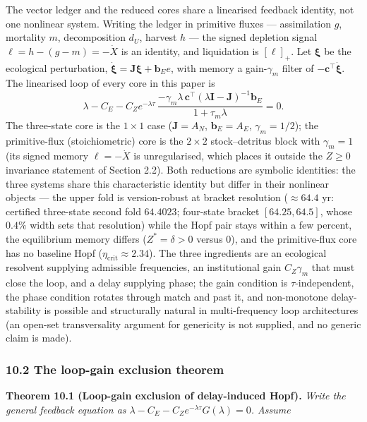 \documentclass[11pt]{article}
\begin{document}
The vector ledger and the reduced cores share a linearised feedback
identity, not one nonlinear system. Writing the ledger in primitive
fluxes --- assimilation \(g\), mortality \(m\), decomposition \(d_U\),
harvest \(h\) --- the signed depletion signal
\(\ell = h - (g - m) = -\dot X\) is an identity, and liquidation is
\([\ell]_+\). Let \(\boldsymbol{\xi}\) be the ecological perturbation,
\(\dot{\boldsymbol{\xi}} = \mathbf{J}\boldsymbol{\xi} + \mathbf{b}_E e\),
with memory a gain-\(\gamma_m\) filter of
\(-\mathbf{c}^\top\dot{\boldsymbol{\xi}}\). The linearised loop of every
core in this paper is
\[\lambda - C_E - C_Z e^{-\lambda\tau}\, \frac{-\gamma_m\lambda\,\mathbf{c}^\top(\lambda\mathbf{I} - \mathbf{J})^{-1}\mathbf{b}_E}{1 + \tau_m\lambda} = 0. \tag{14}\]
The three-state core is the \(1\times1\) case (\(\mathbf{J} = A_N\),
\(\mathbf{b}_E = A_E\), \(\gamma_m = 1/2\)); the primitive-flux
(stoichiometric) core is the \(2\times2\) stock--detritus block with
\(\gamma_m = 1\) (its signed memory \(\ell = -\dot X\) is unregularised,
which places it outside the \(Z \ge 0\) invariance statement of Section
2.2). Both reductions are symbolic identities: the three systems share
this characteristic identity but differ in their nonlinear objects ---
the upper fold is version-robust at bracket resolution (\(\approx64.4\)
yr: certified three-state second fold \(64.4023\); four-state bracket
\([64.25, 64.5]\), whose \(0.4\%\) width sets that resolution) while the
Hopf pair stays within a few percent, the equilibrium memory differs
(\(Z^* = \delta > 0\) versus \(0\)), and the primitive-flux core has no
baseline Hopf (\(\eta_{\mathrm{crit}} \approx 2.34\)). The three
ingredients are an ecological resolvent supplying admissible
frequencies, an institutional gain \(C_Z\gamma_m\) that must close the
loop, and a delay supplying phase; the gain condition is
\(\tau\)-independent, the phase condition rotates through match and past
it, and non-monotone delay-stability is possible and structurally
natural in multi-frequency loop architectures (an open-set
transversality argument for genericity is not supplied, and no generic
claim is made).

\subsubsection{10.2 The loop-gain exclusion
theorem}\label{the-loop-gain-exclusion-theorem}

\textbf{Theorem 10.1 (Loop-gain exclusion of delay-induced Hopf).}
\emph{Write the general feedback equation as
\(\lambda - C_E - C_Z e^{-\lambda\tau}G(\lambda) = 0\). Assume}
\end{document}
